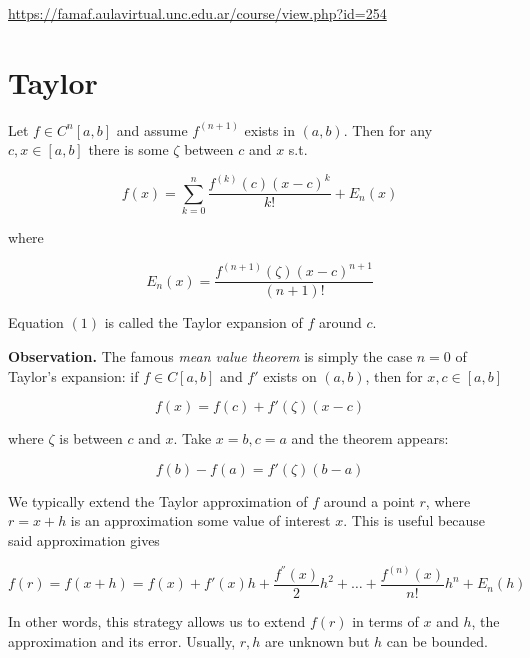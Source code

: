 \documentclass[12pt]{article}
\theoremstyle{definition}
\begin{document}
\url{https://famaf.aulavirtual.unc.edu.ar/course/view.php?id=254}

\section{Taylor}

Let $f \in C^n[a, b]$ and assume $f^{(n+1)}$ exists in $(a, b)$. Then 
for any $c, x \in [a, b]$ there is some $\zeta$ between $c$ and $x$ s.t. 

\begin{equation}
f(x) = \sum_{k=0}^{n} \frac{f^{(k)}(c)(x-c)^k}{k!} + E_n(x)
\end{equation}

where 

\begin{equation*}
    E_n(x) = \frac{f^{(n+1)}(\zeta)(x-c)^{n+1}}{(n+1)!}
\end{equation*}

Equation $(1)$ is called the Taylor expansion of $f$ around $c$. 

\begin{shaded}
    \textbf{Observation.} The famous \textit{mean value theorem} is simply the
    case $n = 0$ of Taylor's expansion: if $f \in C[a, b]$ and $f'$ exists on
    $(a, b)$, then for $x, c \in [a, b]$

    \begin{equation*}
        f(x) = f(c) + f'(\zeta)(x-c)
    \end{equation*}

    where $\zeta$ is between $c$ and $x$. Take $x=b, c = a$ and the theorem
    appears:

    \begin{equation*}
        f(b) - f(a) = f'(\zeta)(b-a)
    \end{equation*}
\end{shaded}

We typically extend the Taylor approximation of $f$ around a point $r$, where
$r = x + h$ is an approximation some value of interest $x$. This is useful
because said approximation gives 

\begin{equation*}
    f(r) = f(x+h) = f(x) + f'(x)h + \frac{ f^{''}(x) }{2}h^2 + \ldots + 
    \frac{ f^{(n)}(x) }{n!}h^n + E_n(h)
\end{equation*}

In other words, this strategy allows us to extend $f(r)$ in terms of $x$ and
$h$, the approximation and its error. Usually, $r, h$ are unknown but $h$ can be
bounded.
\end{document}
